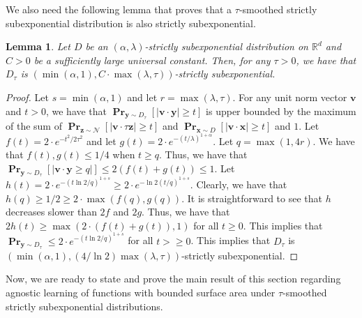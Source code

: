 \documentclass[10pt,a4paper]{article}
\newtheorem{lemma}{Lemma}[section]
\renewcommand\vec[1]{\mathbf{#1}}
\DeclareMathOperator*{\pr}{\mathbf{Pr}}
\newcommand{\R}{\mathbb{R}}
\newcommand{\1}{\Ind}
\newcommand{\x}{\vec x}
\newcommand{\vv}{\vec v}
\newcommand{\z}{\vec z}
\newcommand{\Gauss}{\mathcal{N}}
\begin{document}
We also need the following lemma that proves that a $\tau$-smoothed strictly subexponential distribution is also strictly subexponential.
\begin{lemma}
\label{lem:subexp_convolve}
Let $D$ be an $(\alpha,\lambda)$-strictly subexponential distribution on $\R^{d}$ and $C>0$ be a sufficiently large universal constant. Then, for any $\tau>0$, we have that $D_{\tau}$ is $(\min(\alpha,1),C\cdot \max(\lambda,\tau))$-strictly subexponential.
\end{lemma}
\begin{proof}
    Let $s=\min(\alpha,1)$ and let $r=\max(\lambda,\tau)$. For any unit norm vector $\vv$ and $t>0$, we have that $\pr_{\vec y\sim D_{\tau}}[|\vv\cdot \vec y|\geq t]$ is upper bounded by the maximum of the sum of $\pr_{\z\sim \Gauss}[|\vv\cdot \tau \z|\geq t]$ and $\pr_{\x\sim D}[|\vv\cdot \x|\geq t]$ and $1$. Let $f(t)=2\cdot e^{-t^2/2\tau^2}$ and let $g(t)=2\cdot e^{-(t/\lambda)^{1+\alpha}}$. Let $q=\max(1,4r)$. We have that $f(t),g(t)\leq 1/4$ when $t\geq q$. Thus, we have that $\pr_{\vec y\sim D_{\tau}}[|\vv\cdot \vec y\geq q|]\leq 2(f(t)+g(t))\leq 1$. Let $h(t)=2\cdot e^{-(t\ln 2/q)^{1+s}}\geq 2\cdot e^{-\ln 2 (t/q)^{1+s}}$. Clearly, we have that $h(q)\geq 1/2\geq 2\cdot \max{(f(q),g(q))}$. It is straightforward to see that $h$ decreases slower than $2f$ and $2g$. Thus, we have that $2h(t)\geq \max(2\cdot(f(t)+g(t)),1)$ for all $t\geq 0$. This implies that $\pr_{\vec y\sim D_{\tau}}\leq 2\cdot e^{-(t\ln 2/q)^{1+s}}$ for all $t>\geq 0$. This implies that $D_{\tau}$ is $(\min(\alpha,1),(4/\ln 2)\max(\lambda,\tau))$-strictly subexponential.
    
\end{proof}

Now, we are ready to state and prove the main result of this section regarding agnostic learning of functions with bounded surface area under $\tau$-smoothed strictly subexponential distributions.
\end{document}
